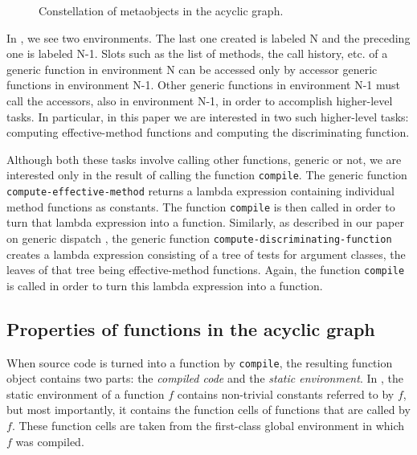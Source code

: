 \begin{figure}
\begin{center}
\end{center}
\caption{\label{fig-constellation}
Constellation of metaobjects in the acyclic graph.}
\end{figure}

In , we see two environments.  The last one
created is labeled N and the preceding one is labeled N-1.  Slots such
as the list of methods, the call history, etc. of a generic function
in environment N can be accessed only by accessor generic functions in
environment N-1.  Other generic functions in environment N-1 must call
the accessors, also in environment N-1, in order to accomplish
higher-level tasks.  In particular, in this paper we are interested in
two such higher-level tasks: computing effective-method functions and
computing the discriminating function.

Although both these tasks involve calling other functions, generic or
not, we are interested only in the result of calling the function
\texttt{compile}.  The generic function
\texttt{compute-effective-method} returns a lambda expression
containing individual method functions as constants.  The function
\texttt{compile} is then called in order to turn that lambda
expression into a function.  Similarly, as described in our paper on
generic dispatch \cite{Strandh:2014:FGD:2635648.2635654}, the generic
function \texttt{compute-discriminating-function} creates  a lambda
expression consisting of a tree of tests for argument classes, the
leaves of that tree being effective-method functions.  Again, the
function \texttt{compile} is called in order to turn this lambda
expression into a function.

\subsection{Properties of functions in the acyclic graph}

When source code is turned into a function by \texttt{compile}, the
resulting function object contains two parts: the
\emph{compiled code} and the \emph{static environment}.  In \sicl{},
the static environment of a function $f$ contains non-trivial
constants referred to by $f$, but most importantly, it contains the
function cells of functions that are called by $f$.  These function
cells are taken from the first-class global environment in which $f$
was compiled.


